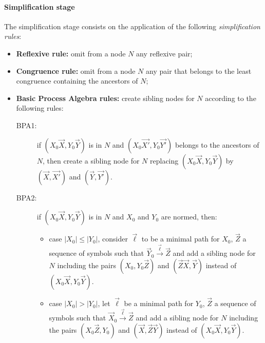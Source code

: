 \paragraph*{Simplification stage} The simplification stage consists on the
application of the following \emph{simplification rules}:
\begin{itemize}
	\item {\bf Reflexive rule:} omit from a node $N$ any reflexive pair;
	\item {\bf Congruence rule:}  omit from a node $N$ any pair that
	      belongs to the least congruence containing the ancestors of $N$;
	\item {\bf Basic Process Algebra rules:} create sibling nodes for $N$
		  according to the following rules:
		  \begin{description}
		  	\item[BPA1:] if $(X_0 \vec X, Y_0 \vec Y)$ is in $N$ and $(X_0
		  		  \vec {X'}, Y_0 \vec {Y'})$ belongs to the ancestors of $N$,
		  		  then create a sibling node for $N$ replacing $(X_0 \vec X,
		  		  Y_0 \vec Y)$ by $(\vec X, \vec {X'})$ and $(\vec Y, \vec {Y'})$.
		  	\item[BPA2:] if $(X_0 \vec X, Y_0 \vec Y)$ is in $N$ and $X_0$ and
		  	$Y_0$ are normed, then:
		  	\begin{itemize}[label=$\bullet$]
		  		\item case $|X_0| \leq |Y_0|$, consider $\vec \ell$ to be a minimal
		  	          path for $X_0$, $\vec Z$ a sequence of symbols such that
		  	          $\vec Y_0 \xrightarrow{\vec \ell} \vec Z$ and add a sibling node
		  	          for $N$ including the pairs $(X_0, Y_0 \vec Z)$
		  	          and $(\vec Z \vec X, \vec Y)$ instead of
		  	          $(X_0 \vec X, Y_0 \vec Y)$.
		  	     \item case $|X_0| > |Y_0|$, let $\vec \ell$ be a minimal
		  	          path for $Y_0$, $\vec Z$ a sequence of symbols such that
		  	          $\vec X_0 \xrightarrow{\vec \ell} \vec Z$ and add a sibling node
		  	          for $N$ including the pairs $(X_0 \vec Z, Y_0 )$
		  	          and $(\vec X, \vec Z \vec Y)$ instead of
		  	          $(X_0 \vec X, Y_0 \vec Y)$.
		  	\end{itemize}
		  \end{description}
\end{itemize}


